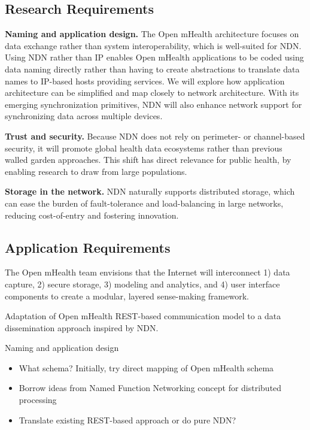 \subsection{Research Requirements} 

{\bf Naming and application design.} The Open mHealth architecture focuses on data exchange rather than system interoperability, which is well-suited for NDN. Using NDN rather than IP enables Open mHealth applications to be coded using data naming directly rather than having to create abstractions to translate data names to IP-based hosts providing services. We will explore how application architecture can be simplified and map closely to network architecture. With its emerging synchronization primitives, NDN will also enhance network support for synchronizing data across multiple devices. 

{\bf Trust and security.} Because NDN does not rely on perimeter- or channel-based security, it will promote global health data ecosystems rather than previous walled garden approaches.   This shift has direct relevance for public health, by enabling research to draw from large populations. 

{\bf Storage in the network.} NDN naturally supports distributed storage, which can ease the burden of fault-tolerance and load-balancing in large networks, reducing cost-of-entry and fostering innovation. 


\subsection{Application Requirements}
The Open mHealth team envisions that the Internet will interconnect 1)
data capture, 2) secure storage, 3) modeling and analytics, and 4) user
interface components to create a modular, layered sense-making framework.  

Adaptation of Open mHealth REST-based communication model to a data dissemination approach inspired by NDN.

Naming and application design
\begin{itemize}
\item What schema? Initially, try direct mapping of Open mHealth schema
\item Borrow ideas from Named Function Networking concept for distributed processing
\item Translate existing REST-based approach or do pure NDN? 
\end{itemize}

